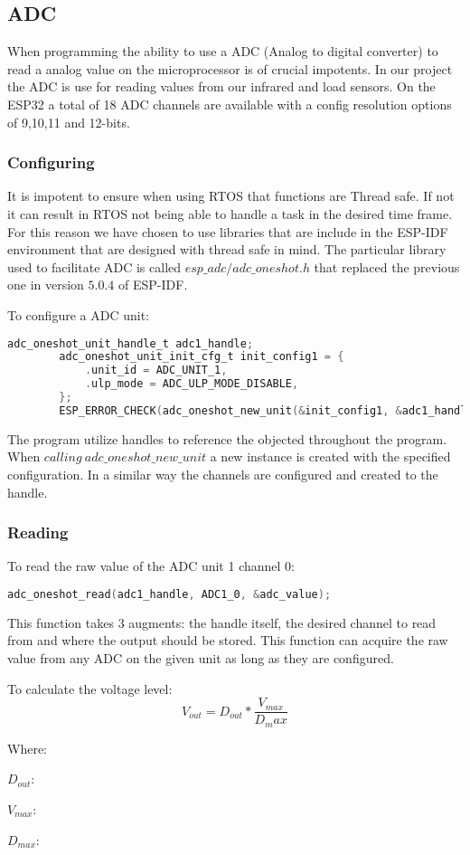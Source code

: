 \documentclass[../report.tex]{subfiles}
\begin{document}
    \subsection{ADC}
    When programming the ability to use a ADC (Analog to digital converter) to
    read a analog value on the microprocessor is of crucial impotents. In our
    project the ADC is use for reading values from our infrared and load
    sensors. On the ESP32 a total of 18 ADC channels are available with a config
    resolution options of 9,10,11 and 12-bits.
    \subsubsection{Configuring}
    It is impotent to ensure when using RTOS that functions are Thread safe. If
    not it can result in RTOS not being able to handle a task in the desired
    time frame. For this reason we have chosen to use libraries that are
    include in the ESP-IDF environment that are designed with thread safe in
    mind. The particular library used to facilitate ADC is called
    $esp\_adc/adc\_oneshot.h$ that replaced the previous one in version $5.0.4$ of
    ESP-IDF. 

    To configure a ADC unit:
    \begin{lstlisting}[language=c, caption={Configuring ADC unit 1}]
        adc_oneshot_unit_handle_t adc1_handle;
        adc_oneshot_unit_init_cfg_t init_config1 = {
            .unit_id = ADC_UNIT_1,
            .ulp_mode = ADC_ULP_MODE_DISABLE,
        };
        ESP_ERROR_CHECK(adc_oneshot_new_unit(&init_config1, &adc1_handle));
    \end{lstlisting}

    The program utilize handles to reference the objected throughout the
    program. When $calling\ adc\_oneshot\_new\_unit$ a new instance is created with
    the specified configuration. In a similar way the channels are configured
    and created to the handle.
    \subsubsection{Reading}
    To read the raw value of the ADC unit 1 channel 0:
    \begin{lstlisting}[language=c, caption={Readning ADC unit 1 channel 0}]
        adc_oneshot_read(adc1_handle, ADC1_0, &adc_value);
    \end{lstlisting}
    This function takes 3 augments: the handle itself, the desired channel to
    read from and where the output should be stored.
    This function can acquire the raw value from any ADC on the given unit as
    long as they are configured.

    To calculate the voltage level:
    \begin{equation}
        V_{out}=D_{out}*\dfrac{V_{max}}{D_max}
    \end{equation}
    
    Where:

    $D_{out}$:

    $V_{max}$:
    
    $D_{max}$:
\end{document}
